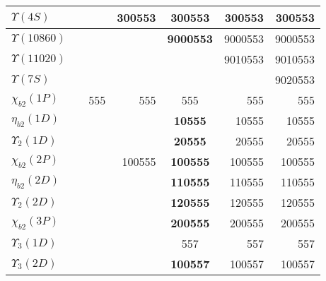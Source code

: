 \begin{tabular}{|l@{\tstrut}|r|r|r|c|r|r|}
$\Upsilon(4S)$                 &     &         & 300553 & \bf{300553} &  300553 & 300553 \\ \hline
$\Upsilon(10860)$              &     &         &        & \bf{9000553} & 9000553 & 9000553 \\ \hline
$\Upsilon(11020)$              &     &         &        &  & 9010553 & 9010553 \\ \hline
$\Upsilon(7S)$                 &     &         &        &  &         & 9020553 \\ \hline\hline
$\chi_{b2}(1P)$                &     &   555   &    555 & 555 &     555 & 555 \\ \hline
$\eta_{b2}(1D)$                &     &         &        & \bf{10555} &   10555 & 10555 \\ \hline
$\Upsilon_2(1D)$               &     &         &        & \bf{20555} &   20555 & 20555 \\ \hline
$\chi_{b2}(2P)$                &     &         & 100555 & \bf{100555} &  100555 & 100555 \\ \hline
$\eta_{b2}(2D)$                &     &         &        & \bf{110555} &  110555 & 110555 \\ \hline
$\Upsilon_2(2D)$               &     &         &        & \bf{120555} &  120555 & 120555 \\ \hline
$\chi_{b2}(3P)$                &     &         &        & \bf{200555} &  200555 & 200555 \\ \hline\hline
$\Upsilon_3(1D)$               &     &         &        &  557   &     557 & 557 \\ \hline
$\Upsilon_3(2D)$               &     &         &        & \bf{100557} &  100557 & 100557 \\ \hline
\end{tabular}

